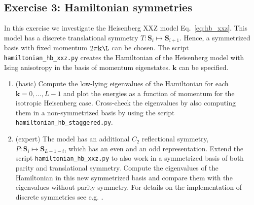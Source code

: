 \documentclass[]{article}
\theoremstyle{definition}
\begin{document}
\subsection*{Exercise 3: Hamiltonian symmetries}
In this exercise we investigate the Heisenberg XXZ model
Eq.~\ref{eq:hb_xxz}. This model has a discrete translational symmetry
$T:\mathbf{S}_i \mapsto \mathbf{S}_{i+1}$. Hence, a symmetrized basis
with fixed momentum $2\pi\mathbf{k}\L$ can be chosen. The script
\texttt{hamiltonian\_hb\_xxz.py} creates the Hamiltonian of the
Heisenberg model with Ising anisotropy in the basis of momentum
eigenstates. $\mathbf{k}$ can be specified.
\begin{enumerate}
\item (basic) Compute the low-lying eigenvalues of the Hamiltonian for
  each $\mathbf{k} = 0, \ldots, L-1$ and plot the energies as a
  function of momentum for the isotropic Heisenberg case.  Cross-check
  the eigenvalues by also computing them in a non-symmetrized basis by
  using the script \texttt{hamiltonian\_hb\_staggered.py}.
\item (expert) The model has an additional $C_2$ reflectional
  symmetry, $P:\mathbf{S}_i \mapsto \mathbf{S}_{L-1-i}$, which has an
  even and an odd representation. Extend the script
  \texttt{hamiltonian\_hb\_xxz.py} to also work in a symmetrized basis
  of both parity and translational symmetry. Compute the eigenvalues
  of the Hamiltonian in this new symmetrized basis and compare them
  with the eigenvalues without parity symmetry. For details on the
  implementation of discrete symmetries see e.g. \cite{weise}.
\end{enumerate}

\end{document}
